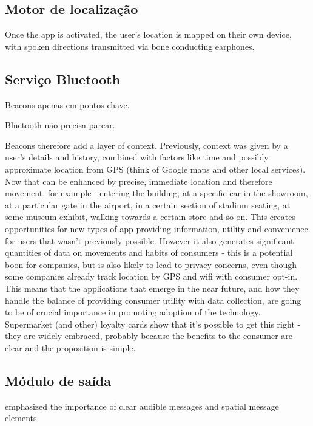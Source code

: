 \documentclass[english,brazilian]{UNISINOSmonografia}
\begin{document}
		\subsection{Motor de localização}
Once the app is activated, the user’s location is mapped on their own device, with spoken directions transmitted via bone conducting earphones.



		\subsection{Serviço Bluetooth}

Beacons apenas em pontos chave. 

Bluetooth não precisa parear.


Beacons therefore add a layer of context. Previously, context was given by a user's details and history, combined with factors like time and possibly approximate location from GPS (think of Google maps and other local services). Now that can be enhanced by precise, immediate location and therefore movement, for example - entering the building, at a specific car in the showroom, at a particular gate in the airport, in a certain section of stadium seating, at some museum exhibit, walking towards a certain store and so on.
This creates opportunities for new types of app providing information, utility and convenience for users that wasn't previously possible. However it also generates significant quantities of data on movements and habits of consumers - this is a potential boon for companies, but is also likely to lead to privacy concerns, even though some companies already track location by GPS and wifi with consumer opt-in.
This means that the applications that emerge in the near future, and how they handle the balance of providing consumer utility with data collection, are going to be of crucial importance in promoting adoption of the technology. Supermarket (and other) loyalty cards show that it's possible to get this right - they are widely embraced, probably because the benefits to the consumer are clear and the proposition is simple.


		\subsection{Módulo de saída} %



 emphasized the importance of clear audible messages and spatial message elements 
\end{document}

